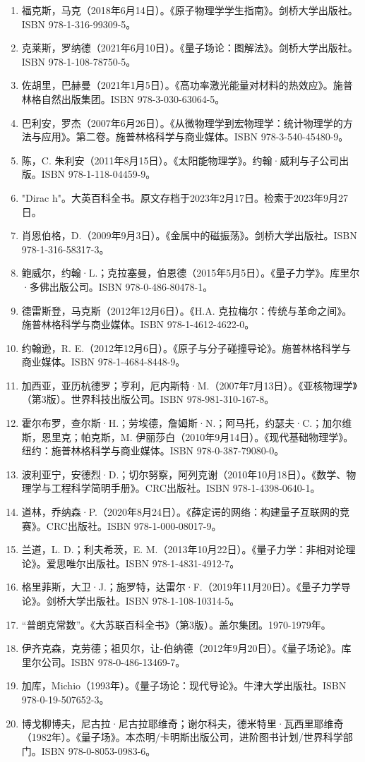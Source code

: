 \begin{enumerate}
\item 福克斯，马克（2018年6月14日）。《原子物理学学生指南》。剑桥大学出版社。ISBN 978-1-316-99309-5。  
\item 克莱斯，罗纳德（2021年6月10日）。《量子场论：图解法》。剑桥大学出版社。ISBN 978-1-108-78750-5。
\item 佐胡里，巴赫曼（2021年1月5日）。《高功率激光能量对材料的热效应》。施普林格自然出版集团。ISBN 978-3-030-63064-5。  
\item 巴利安，罗杰（2007年6月26日）。《从微物理学到宏物理学：统计物理学的方法与应用》。第二卷。施普林格科学与商业媒体。ISBN 978-3-540-45480-9。  
\item 陈，C. 朱利安（2011年8月15日）。《太阳能物理学》。约翰·威利与子公司出版。ISBN 978-1-118-04459-9。  
\item "Dirac h"。大英百科全书。原文存档于2023年2月17日。检索于2023年9月27日。
\item 肖恩伯格，D.（2009年9月3日）。《金属中的磁振荡》。剑桥大学出版社。ISBN 978-1-316-58317-3。  
\item 鲍威尔，约翰·L.；克拉塞曼，伯恩德（2015年5月5日）。《量子力学》。库里尔·多佛出版公司。ISBN 978-0-486-80478-1。
\item 德雷斯登，马克斯（2012年12月6日）。《H.A. 克拉梅尔：传统与革命之间》。施普林格科学与商业媒体。ISBN 978-1-4612-4622-0。  
\item 约翰逊，R. E.（2012年12月6日）。《原子与分子碰撞导论》。施普林格科学与商业媒体。ISBN 978-1-4684-8448-9。  
\item 加西亚，亚历杭德罗；亨利，厄内斯特·M.（2007年7月13日）。《亚核物理学》（第3版）。世界科技出版公司。ISBN 978-981-310-167-8。
\item 霍尔布罗，查尔斯·H.；劳埃德，詹姆斯·N.；阿马托，约瑟夫·C.；加尔维斯，恩里克；帕克斯，M. 伊丽莎白（2010年9月14日）。《现代基础物理学》。纽约：施普林格科学与商业媒体。ISBN 978-0-387-79080-0。  
\item 波利亚宁，安德烈·D.；切尔努察，阿列克谢（2010年10月18日）。《数学、物理学与工程科学简明手册》。CRC出版社。ISBN 978-1-4398-0640-1。  
\item 道林，乔纳森·P.（2020年8月24日）。《薛定谔的网络：构建量子互联网的竞赛》。CRC出版社。ISBN 978-1-000-08017-9。
\item 兰道，L. D.；利夫希茨，E. M.（2013年10月22日）。《量子力学：非相对论理论》。爱思唯尔出版社。ISBN 978-1-4831-4912-7。  
\item 格里菲斯，大卫·J.；施罗特，达雷尔·F.（2019年11月20日）。《量子力学导论》。剑桥大学出版社。ISBN 978-1-108-10314-5。  
\item “普朗克常数”。《大苏联百科全书》（第3版）。盖尔集团。1970-1979年。
\item 伊齐克森，克劳德；祖贝尔，让-伯纳德（2012年9月20日）。《量子场论》。库里尔公司。ISBN 978-0-486-13469-7。  
\item 加库，Michio（1993年）。《量子场论：现代导论》。牛津大学出版社。ISBN 978-0-19-507652-3。  
\item 博戈柳博夫，尼古拉·尼古拉耶维奇；谢尔科夫，德米特里·瓦西里耶维奇（1982年）。《量子场》。本杰明/卡明斯出版公司，进阶图书计划/世界科学部门。ISBN 978-0-8053-0983-6。

\end{enumerate}
